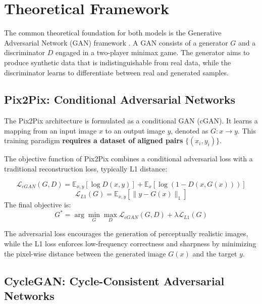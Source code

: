 \documentclass[journal]{IEEEtran}
\begin{document}
\section{Theoretical Framework}

 The common theoretical foundation for both models is the Generative
 Adversarial Network (GAN) framework \cite{Goodfellow2014}. A GAN consists
 of a generator $G$ and a discriminator $D$ engaged in a two-player
 minimax game. The generator aims to produce synthetic data that is
 indistinguishable from real data, while the discriminator learns to
 differentiate between real and generated samples.

\subsection{Pix2Pix: Conditional Adversarial Networks}

 The Pix2Pix architecture \cite{Isola2017} is formulated as a conditional
 GAN (cGAN). It learns a mapping from an input image $x$ to an output
 image $y$, denoted as $G: x \rightarrow y$. This training paradigm
 \textbf{requires a dataset of aligned pairs} $\{(x_i, y_i)\}$.

The objective function of Pix2Pix combines a conditional adversarial loss with a traditional reconstruction loss, typically L1 distance:

\begin{equation}
\mathcal{L}_{cGAN}(G, D) = \mathbb{E}_{x,y}[\log D(x, y)] + \mathbb{E}_{x}[\log (1 - D(x, G(x)))]
\end{equation}
\begin{equation}
\mathcal{L}_{L1}(G) = \mathbb{E}_{x,y}[\|y - G(x)\|_1]
\end{equation}
The final objective is:
\begin{equation}
G^* = \arg \min_G \max_D \mathcal{L}_{cGAN}(G, D) + \lambda \mathcal{L}_{L1}(G)
\end{equation}

The adversarial loss encourages the generation of perceptually realistic images, while the L1 loss enforces low-frequency correctness and sharpness by minimizing the pixel-wise distance between the generated image $G(x)$ and the target $y$.

\subsection{CycleGAN: Cycle-Consistent Adversarial Networks}
\end{document}
